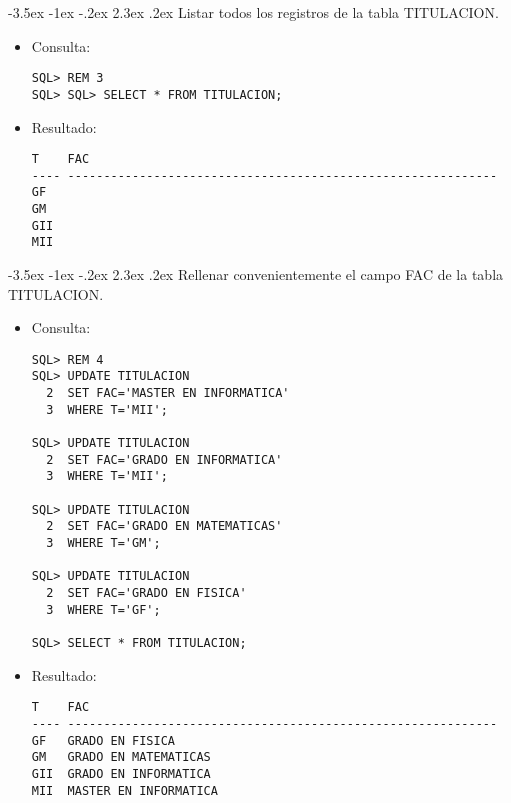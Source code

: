 \documentclass[11pt]{report}
\makeatletter
\renewcommand\chapter{\@startsection{chapter}{0}{\z@}%
    {-3.5ex \@plus -1ex \@minus -.2ex}%
    {2.3ex \@plus.2ex}%
    {\normalfont\Large\bfseries}}
\makeatother
\begin{document}
\chapter{Listar todos los registros de la tabla TITULACION.}
\begin{itemize}
  \item Consulta:
  \begin{verbatim}
SQL> REM 3
SQL> SQL> SELECT * FROM TITULACION;
  \end{verbatim}
  \item{Resultado:}
  \begin{verbatim}
T    FAC                                                                        
---- ------------------------------------------------------------               
GF                                                                              
GM                                                                              
GII                                                                             
MII 
  \end{verbatim}
\end{itemize}

\chapter{Rellenar convenientemente el campo FAC de la tabla TITULACION.}
\begin{itemize}
  \item Consulta:
  \begin{verbatim}
SQL> REM 4
SQL> UPDATE TITULACION
  2  SET FAC='MASTER EN INFORMATICA'
  3  WHERE T='MII';

SQL> UPDATE TITULACION
  2  SET FAC='GRADO EN INFORMATICA'
  3  WHERE T='MII';

SQL> UPDATE TITULACION
  2  SET FAC='GRADO EN MATEMATICAS'
  3  WHERE T='GM';

SQL> UPDATE TITULACION
  2  SET FAC='GRADO EN FISICA'
  3  WHERE T='GF';

SQL> SELECT * FROM TITULACION;
  \end{verbatim}
  \item{Resultado:}
  \begin{verbatim}
T    FAC                                                                        
---- ------------------------------------------------------------               
GF   GRADO EN FISICA                                                            
GM   GRADO EN MATEMATICAS                                                       
GII  GRADO EN INFORMATICA                                                       
MII  MASTER EN INFORMATICA 
  \end{verbatim}
\end{itemize}
\end{document}
